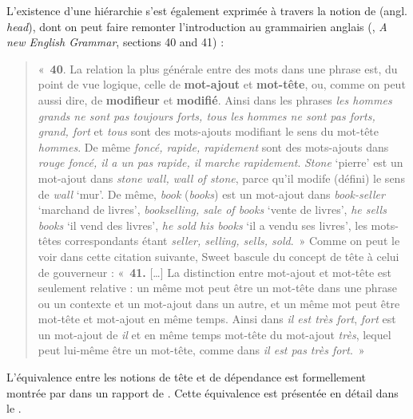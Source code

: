 {    L’existence d’une hiérarchie s’est également exprimée à travers la notion de  (angl. \textit{head}), dont on peut faire remonter l’introduction au grammairien anglais  (\citeyear{sweet1891new}, \textit{A new English Grammar}, sections 40 and 41) : 
    \begin{quote}«~\textbf{40}. La relation la plus générale entre des mots dans une phrase est, du point de vue logique, celle de \textbf{mot-ajout} et \textbf{mot-tête}, ou, comme on peut aussi dire, de \textbf{modifieur} et \textbf{modifié}. Ainsi dans les phrases \textit{les hommes grands ne sont pas toujours forts, tous les hommes ne sont pas forts, grand, fort} et \textit{tous} sont des mots-ajouts modifiant le sens du mot-tête \textit{hommes}. De même \textit{foncé, rapide, rapidement} sont des mots-ajouts dans \textit{rouge foncé, il a un pas rapide, il marche rapidement}. \textit{Stone} ‘pierre’ est un mot-ajout dans \textit{stone wall, wall of stone}, parce qu’il modife (défini) le sens de \textit{wall} ‘mur’. De même, \textit{book} (\textit{books}) est un mot-ajout dans \textit{book-seller} ‘marchand de livres’, \textit{bookselling, sale of books} ‘vente de livres’, \textit{he sells books} ‘il vend des livres’, \textit{he sold his books} ‘il a vendu ses livres’, les mots-têtes correspondants étant \textit{seller, selling, sells, sold}.~» Comme on peut le voir dans cette citation suivante, Sweet bascule du concept de tête à celui de gouverneur : «~\textbf{41.} […] La distinction entre mot-ajout et mot-tête est seulement relative : un même mot peut être un mot-tête dans une phrase ou un contexte et un mot-ajout dans un autre, et un même mot peut être mot-tête et mot-ajout en même temps. Ainsi dans \textit{il est très fort}, \textit{fort} est un mot-ajout de \textit{il} et en même temps mot-tête du mot-ajout \textit{très}, lequel peut lui-même être un mot-tête, comme dans \textit{il est pas très fort}.~» \end{quote}

    L’équivalence entre les notions de tête et de dépendance est formellement montrée par  dans un rapport de \citeyear{lecerf1960programme}. Cette équivalence est présentée en détail dans le .

}
